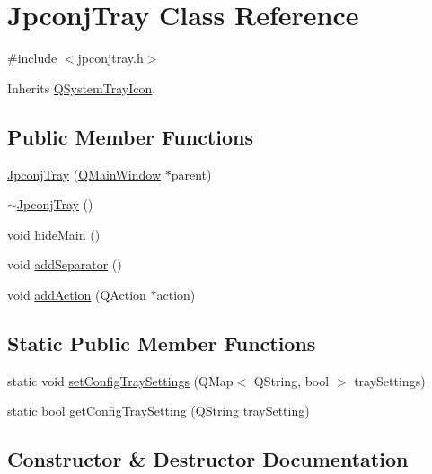 \hypertarget{class_jpconj_tray}{}\section{Jpconj\+Tray Class Reference}
\label{class_jpconj_tray}


{\ttfamily \#include $<$jpconjtray.\+h$>$}



Inherits \hyperlink{class_q_system_tray_icon}{Q\+System\+Tray\+Icon}.

\subsection*{Public Member Functions}
\begin{DoxyCompactItemize}
\item 
\hyperlink{class_jpconj_tray_aa6ee3ce6f9c81b437607a8dfa8263278}{Jpconj\+Tray} (\hyperlink{class_q_main_window}{Q\+Main\+Window} $\ast$parent)
\item 
\hyperlink{class_jpconj_tray_a0b6b76f13ed64254b48af35e7103340b}{$\sim$\+Jpconj\+Tray} ()
\item 
void \hyperlink{class_jpconj_tray_aa8290d8767dab2bd39f088325e0944be}{hide\+Main} ()
\item 
void \hyperlink{class_jpconj_tray_a6c3e3041a7b195d792fa0f7f8a4e4a54}{add\+Separator} ()
\item 
void \hyperlink{class_jpconj_tray_a5d00b65800ba6dd8549fb48b73a3a505}{add\+Action} (Q\+Action $\ast$action)
\end{DoxyCompactItemize}
\subsection*{Static Public Member Functions}
\begin{DoxyCompactItemize}
\item 
static void \hyperlink{class_jpconj_tray_a2af7a57ec9a13aa86b3ba7da0139c16b}{set\+Config\+Tray\+Settings} (Q\+Map$<$ Q\+String, bool $>$ tray\+Settings)
\item 
static bool \hyperlink{class_jpconj_tray_a9a3055295ad6821f498cf2eafb66db88}{get\+Config\+Tray\+Setting} (Q\+String tray\+Setting)
\end{DoxyCompactItemize}


\subsection{Constructor \& Destructor Documentation}
